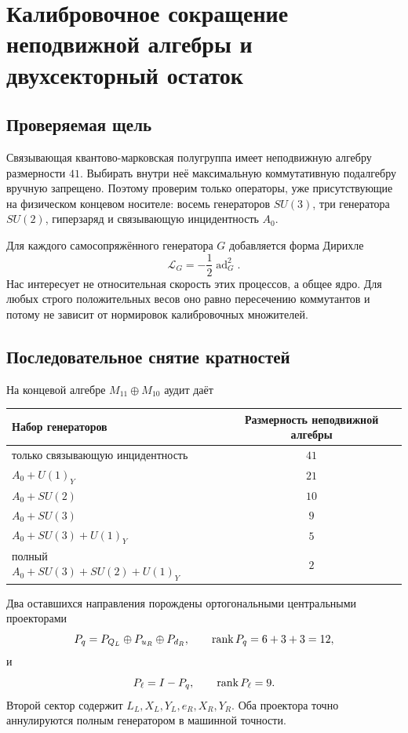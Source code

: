 \chapter{Калибровочное сокращение неподвижной алгебры и двухсекторный остаток}
\label{ch:v8-markov-fixed-algebra-selector-gate}

\section{Проверяемая щель}

Связывающая квантово-марковская полугруппа имеет неподвижную алгебру
размерности $41$. Выбирать внутри неё максимальную коммутативную
подалгебру вручную запрещено. Поэтому проверим только операторы, уже
присутствующие на физическом концевом носителе: восемь генераторов
$SU(3)$, три генератора $SU(2)$, гиперзаряд и связывающую инцидентность $A_0$.

Для каждого самосопряжённого генератора $G$ добавляется форма Дирихле
\begin{equation}
 \mathcal L_G=-\frac12\operatorname{ad}_G^2.
\end{equation}
Нас интересует не относительная скорость этих процессов, а общее ядро.
Для любых строго положительных весов оно равно пересечению коммутантов и
потому не зависит от нормировок калибровочных множителей.

\section{Последовательное снятие кратностей}

На концевой алгебре $M_{11}\oplus M_{10}$ аудит даёт
\begin{center}
\begin{tabular}{lc}
\toprule
Набор генераторов & Размерность неподвижной алгебры\\
\midrule
только связывающую инцидентность & $41$\\
$A_0+U(1)_Y$ & $21$\\
$A_0+SU(2)$ & $10$\\
$A_0+SU(3)$ & $9$\\
$A_0+SU(3)+U(1)_Y$ & $5$\\
полный $A_0+SU(3)+SU(2)+U(1)_Y$ & $2$\\
\bottomrule
\end{tabular}
\end{center}

Два оставшихся направления порождены ортогональными центральными
проекторами
\begin{equation}
 P_q=P_{Q_L}\oplus P_{u_R}\oplus P_{d_R},
 \qquad \operatorname{rank} P_q=6+3+3=12,
 \label{eq:v8-markov-quark-projector}
\end{equation}
и
\begin{equation}
 P_\ell=I-P_q,
 \qquad \operatorname{rank} P_\ell=9.
 \label{eq:v8-markov-lepton-projector}
\end{equation}
Второй сектор содержит $L_L,X_L,Y_L,e_R,X_R,Y_R$. Оба проектора точно
аннулируются полным генератором в машинной точности.

